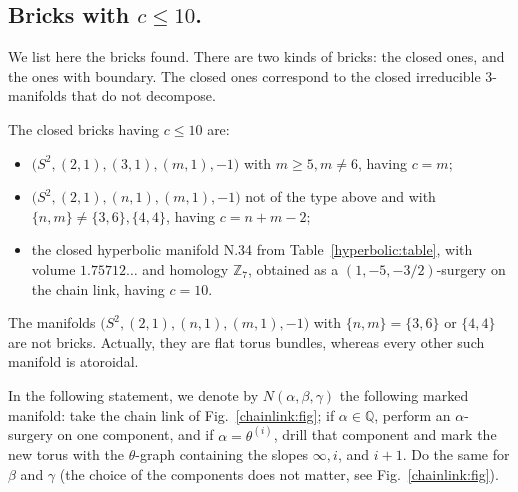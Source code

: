 \documentclass[10pt]{article}      %
\newcommand{\matQ} {\ensuremath {\mathbb{Q}}}
\newcommand{\matZ} {\ensuremath {\mathbb{Z}}}
\begin{document}
\subsection{Bricks with $c\leqslant 10$.} \label{bricks:found:subsection}
We list here the bricks found. There are two kinds of bricks:
the closed ones, and the ones with boundary. The closed ones correspond to the
closed irreducible 3-manifolds that do not decompose. 
\begin{theorem} \label{closed:bricks:teo}
The closed bricks having $c\leqslant 10$ are:
\begin{itemize}
\item
$\big(S^2,(2,1),(3,1),(m,1),-1\big)$ with $m\geqslant 5, m\neq 6$, having $c=m$;
\item
$\big(S^2,(2,1),(n,1),(m,1),-1\big)$ not of the type above and
with $\{n,m\}\neq\{3,6\},\{4,4\}$, having $c=n+m-2$;
\item
the closed hyperbolic manifold N.34 from Table~\ref{hyperbolic:table}, with volume $1.75712\ldots$
and homology $\matZ_7$, obtained as a $(1,-5,-3/2)$-surgery on the chain link, having $c=10$.
\end{itemize}
\end{theorem}
\begin{remark}
The manifolds $\big(S^2,(2,1),(n,1),(m,1),-1\big)$ with $\{n,m\}=\{3,6\}$ or $\{4,4\}$
are not bricks. Actually, they are flat torus bundles, whereas every other such manifold
is atoroidal.
\end{remark}
In the following statement, we denote by $N(\alpha,\beta,\gamma)$ the following marked manifold:
take the chain link of Fig.~\ref{chainlink:fig};
if $\alpha\in\matQ$, perform an $\alpha$-surgery on
one component, and if $\alpha = \theta^{(i)}$, drill that component and mark the new torus
with the $\theta$-graph containing the slopes $\infty, i$, and $i+1$. Do the same for $\beta$ and 
$\gamma$ (the choice of the components does not matter, see Fig.~\ref{chainlink:fig}).
\end{document}

